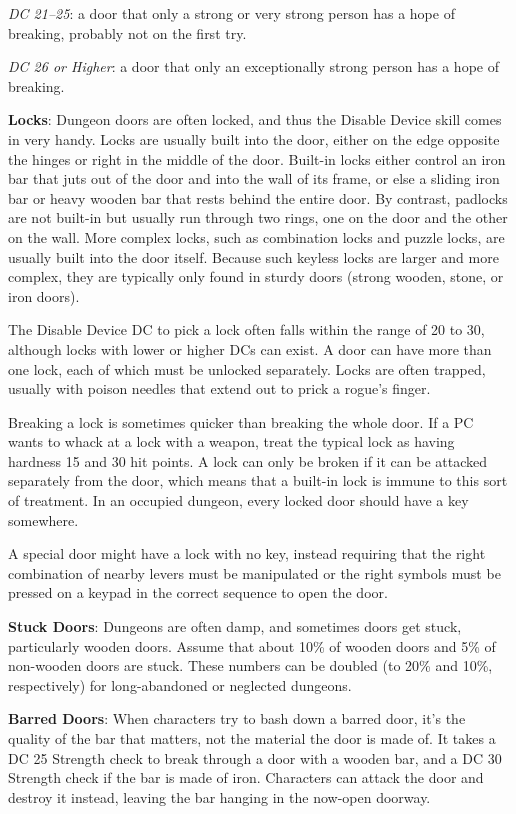 \textit{DC 21--25}: a door that only a strong or very strong person has a hope of breaking, probably not on the first try.
				
\textit{DC 26 or Higher}: a door that only an exceptionally strong person has a hope of breaking.
				
\textbf{Locks}: Dungeon doors are often locked, and thus the Disable Device skill comes in very handy. Locks are usually built into the door, either on the edge opposite the hinges or right in the middle of the door. Built-in locks either control an iron bar that juts out of the door and into the wall of its frame, or else a sliding iron bar or heavy wooden bar that rests behind the entire door. By contrast, padlocks are not built-in but usually run through two rings, one on the door and the other on the wall. More complex locks, such as combination locks and puzzle locks, are usually built into the door itself. Because such keyless locks are larger and more complex, they are typically only found in sturdy doors (strong wooden, stone, or iron doors).
				
The Disable Device DC to pick a lock often falls within the range of 20 to 30, although locks with lower or higher DCs can exist. A door can have more than one lock, each of which must be unlocked separately. Locks are often trapped, usually with poison needles that extend out to prick a rogue's finger.
				
Breaking a lock is sometimes quicker than breaking the whole door. If a PC wants to whack at a lock with a weapon, treat the typical lock as having hardness 15 and 30 hit points. A lock can only be broken if it can be attacked separately from the door, which means that a built-in lock is immune to this sort of treatment. In an occupied dungeon, every locked door should have a key somewhere. 
				
A special door might have a lock with no key, instead requiring that the right combination of nearby levers must be manipulated or the right symbols must be pressed on a keypad in the correct sequence to open the door.
				
\textbf{Stuck Doors}: Dungeons are often damp, and sometimes doors get stuck, particularly wooden doors. Assume that about 10\% of wooden doors and 5\% of non-wooden doors are stuck. These numbers can be doubled (to 20\% and 10\%, respectively) for long-abandoned or neglected dungeons.
				
\textbf{Barred Doors}: When characters try to bash down a barred door, it's the quality of the bar that matters, not the material the door is made of. It takes a DC 25 Strength check to break through a door with a wooden bar, and a DC 30 Strength check if the bar is made of iron. Characters can attack the door and destroy it instead, leaving the bar hanging in the now-open doorway.
				
